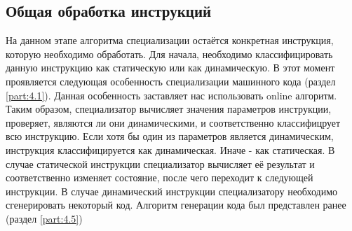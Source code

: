 \documentclass{spbau-diploma}
\begin{document}
\subsection{Общая обработка инструкций}
На данном этапе алгоритма специализации остаётся конкретная инструкция, которую необходимо обработать. Для начала, необходимо классифицировать данную инструкцию как статическую или как динамическую. В этот момент проявляется следующая особенность специализации машинного кода (раздел \ref{part:4.1}). Данная особенность заставляет нас использовать online алгоритм. Таким образом, специализатор вычисляет значения параметров инструкции, проверяет, являются ли они динамическими, и соответственно классифицрует всю инструкцию. Если хотя бы один из параметров является динамическим, инструкция классифицируется как динамическая. Иначе - как статическая.
В случае статической инструкции специализатор вычисляет её результат и соответственно изменяет состояние, после чего переходит к следующей инструкции.
В случае динамический инструкции специализатору необходимо сгенерировать некоторый код. Алгоритм генерации кода был представлен ранее (раздел \ref{part:4.5})
\end{document}

